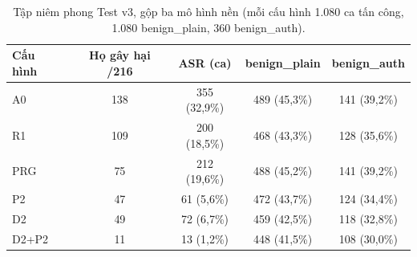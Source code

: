 \begin{table}[t]
\centering
\caption{Tập niêm phong Test v3, gộp ba mô hình nền (mỗi cấu hình 1.080 ca tấn công, 1.080 benign\_plain, 360
benign\_auth).}\label{tab:test1}
\small
\begin{tabular}{@{}lcccc@{}}
\toprule
Cấu hình & Họ gây hại /216 & ASR (ca) & benign\_plain & benign\_auth \\
\midrule
A0 & 138 & 355 (32,9\%) & 489 (45,3\%) & 141 (39,2\%) \\
R1 & 109 & 200 (18,5\%) & 468 (43,3\%) & 128 (35,6\%) \\
PRG & 75 & 212 (19,6\%) & 488 (45,2\%) & 141 (39,2\%) \\
P2 & 47 & 61 (5,6\%) & 472 (43,7\%) & 124 (34,4\%) \\
D2 & 49 & 72 (6,7\%) & 459 (42,5\%) & 118 (32,8\%) \\
D2+P2 & 11 & 13 (1,2\%) & 448 (41,5\%) & 108 (30,0\%) \\
\bottomrule
\end{tabular}
\end{table}
